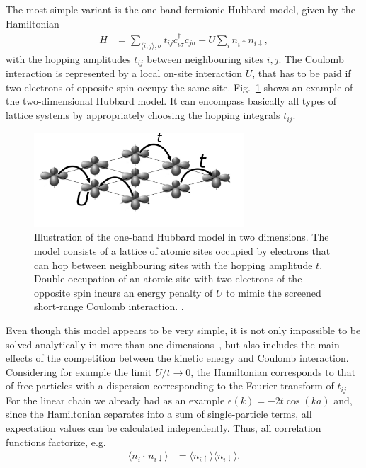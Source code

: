 \documentclass[a4paper,openright,twoside,12pt]{book}
\numberwithin{equation}{section}
\begin{document}
The most simple variant is the one-band fermionic Hubbard model, given by the Hamiltonian
\begin{align}
H 
&= \sum_{\langle i,j\rangle,\sigma} t_{ij} c^{\dagger}_{i\sigma}c_{j\sigma}
  + U \sum_{i}  n_{i\uparrow} n_{i\downarrow},
\end{align}
with the hopping amplitudes $t_{ij}$ between neighbouring sites $i,j$. The Coulomb interaction is 
represented by a local on-site interaction $U$, that has to be paid if two electrons of opposite spin occupy 
the same site. Fig.~\ref{dmft:fig:hubbard_model_lattice} shows an example of the two-dimensional Hubbard model.
It can encompass basically all types of lattice systems by appropriately choosing the hopping integrals $t_{ij}$.
%
\begin{figure}[t]
\begin{center}
\includegraphics[width=0.7\textwidth]{hubbard_lattice.png}
\end{center}
\caption{Illustration of the one-band Hubbard model in two dimensions. The model consists of a lattice of atomic sites
occupied by electrons that can hop between neighbouring sites with the hopping amplitude $t$.
Double occupation of an atomic site with two electrons of the opposite spin incurs an energy penalty
of $U$ to mimic the screened short-range Coulomb interaction.
.}
\label{dmft:fig:hubbard_model_lattice}
\end{figure}
%
Even though this model appears to be very simple, it is not only impossible to be solved analytically in more than one 
dimensions~\cite{Lieb1968}, but also includes the main effects of the competition between the kinetic energy
and Coulomb interaction.
Considering for example the limit $U/t\rightarrow 0$, the Hamiltonian  corresponds to that of free particles 
with a dispersion corresponding to the Fourier transform of $t_{ij}$ For the linear chain
we already had as an example $\epsilon(k)=-2t\cos(ka)$ and, since the Hamiltonian separates into a sum of single-particle
terms, all expectation values can be calculated independently. Thus, all correlation functions factorize, e.g.
\begin{align}
\langle n_{i\uparrow} n_{i\downarrow} \rangle 
&= \langle n_{i\uparrow} \rangle \langle n_{i\downarrow} \rangle.
\end{align}
\end{document}
